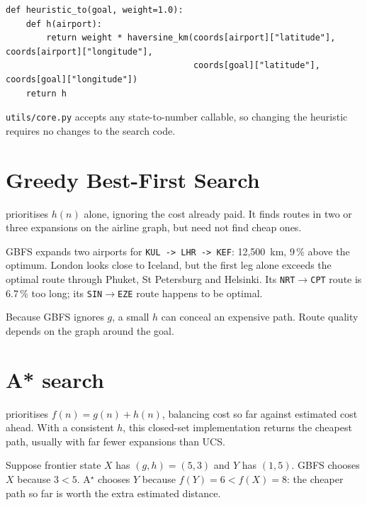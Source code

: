 \begin{lstlisting}[style=utppython]
def heuristic_to(goal, weight=1.0):
    def h(airport):
        return weight * haversine_km(coords[airport]["latitude"], coords[airport]["longitude"],
                                     coords[goal]["latitude"], coords[goal]["longitude"])
    return h
\end{lstlisting}

\texttt{utils/core.py} accepts any state-to-number callable, so changing the heuristic requires no changes to the search code.

\section{Greedy Best-First Search}

 prioritises $h(n)$ alone, ignoring the cost already paid. It finds routes in two or three expansions on the airline graph, but need not find cheap ones.

\begin{workedexample}
GBFS expands two airports for \texttt{KUL -> LHR -> KEF}: 12,500~km, 9\,\% above the optimum. London looks close to Iceland, but the first leg alone exceeds the optimal route through Phuket, St Petersburg and Helsinki. Its \texttt{NRT}$\to$\texttt{CPT} route is 6.7\,\% too long; its \texttt{SIN}$\to$\texttt{EZE} route happens to be optimal.
\end{workedexample}

\begin{pitfall}
Because GBFS ignores $g$, a small $h$ can conceal an expensive path. Route quality depends on the graph around the goal.
\end{pitfall}

\section{A* search}

 prioritises $f(n)=g(n)+h(n)$, balancing cost so far against estimated cost ahead. With a consistent $h$, this closed-set implementation returns the cheapest path, usually with far fewer expansions than UCS.

\begin{workedexample}
Suppose frontier state $X$ has $(g,h)=(5,3)$ and $Y$ has $(1,5)$. GBFS chooses $X$ because $3<5$. A$^\star$ chooses $Y$ because $f(Y)=6<f(X)=8$: the cheaper path so far is worth the extra estimated distance.
\end{workedexample}


